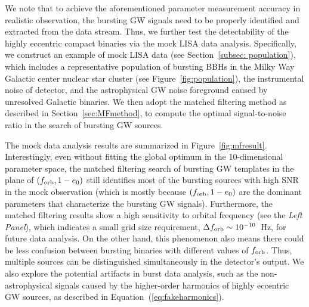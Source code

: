 \documentclass[%
 reprint,
 amsmath,amssymb,
 aps,
]{revtex4-2}
\begin{document}

We note that to achieve the aforementioned parameter measurement accuracy in realistic observation, the bursting GW signals need to be properly identified and extracted from the data stream. Thus, we further test the detectability of the highly eccentric compact binaries via the mock LISA data analysis. Specifically, we construct an example of mock LISA data (see Section~\ref{subsec: population}), which includes a representative population of bursting BBHs in the Milky Way Galactic center nuclear star cluster (see Figure~\ref{fig:population}), the instrumental noise of detector, and the astrophysical GW noise foreground
caused by unresolved Galactic binaries. We then adopt the matched filtering method as described in Section~\ref{sec:MFmethod}, to compute the optimal signal-to-noise ratio in the search of bursting GW sources.



The mock data analysis results are summarized in Figure~\ref{fig:mfresult}. Interestingly, even without fitting the global optimum in the 10-dimensional parameter space, the matched filtering search of bursting GW templates in the plane of $(f_{\rm orb},1-e_0)$ still identifies most
of the bursting sources with high SNR in the mock observation (which is mostly because $(f_{\rm orb},1-e_0)$ are the dominant parameters that characterize the bursting GW signals). Furthermore, the matched filtering results show a high sensitivity to orbital frequency (see the {\it Left Panel}), which indicates a small grid size requirement, $\Delta f_{\rm orb}\sim 10^{-10}$~Hz, for future data analysis. On the other hand, this phenomenon also means there could be less confusion between bursting binaries with different values of $f_{\rm orb}$. Thus, multiple sources can be distinguished simultaneously in the detector's output. We also explore the potential artifacts in burst data analysis, such as the non-astrophysical signals caused by the higher-order harmonics of highly eccentric GW sources, as described in Equation~(\ref{eq:fakeharmonics}). 
\end{document}
